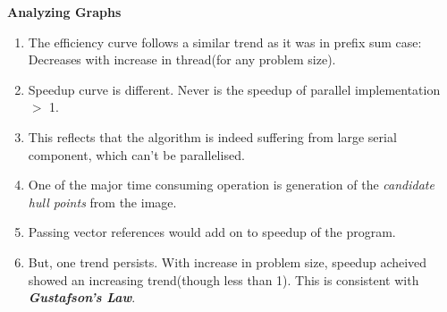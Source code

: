 \documentclass{article}
\newcommand{\bld}[1]{\textbf{#1}}
\newcommand{\ital}[1]{\textit{#1}}
\newcommand{\italb}[1]{\textbf{\textit{{#1}}}}
\begin{document}
\bld{Analyzing Graphs}
\begin{enumerate}
	\item The efficiency curve follows a similar trend as it was in prefix sum case: Decreases with increase in thread(for any problem size).
	\item Speedup curve is different. Never is the speedup of parallel implementation $>$ 1.
	\item This reflects that the algorithm is indeed suffering from large serial component, which can't be parallelised.
	\item One of the major time consuming operation is generation of the \ital{candidate hull points} from the image.
	\item Passing vector references would add on to speedup of the program.
	\item But, one trend persists. With increase in problem size, speedup acheived showed an increasing trend(though less than 1). This is consistent with \italb{Gustafson's Law}.
\end{enumerate}
\end{document}
